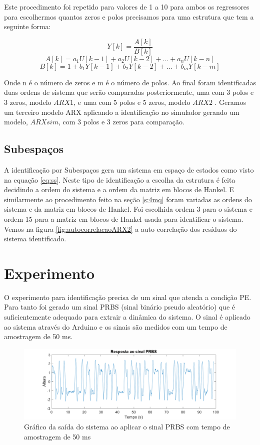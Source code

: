 Este procedimento foi repetido para valores de 1 a 10 para ambos os regressores para escolhermos quantos zeros e polos precisamos para uma estrutura que tem a seguinte forma:

\begin{equation}
Y[k]=\dfrac{A[k]}{B[k]}
\end{equation}
\begin{equation}
A[k]=a_1 U[k-1]+a_2 U[k-2]+ \dots + a_n U[k-n]
\end{equation}
\begin{equation}
B[k]=1+b_1 Y[k-1]+b_2 Y[k-2]+ \dots + b_m Y[k-m]
\end{equation}

Onde n é o número de zeros e m é o número de polos. Ao final foram identificadas duas ordens de sistema que serão comparadas posteriormente, uma com 3 polos e 3 zeros, modelo $ARX1$, e uma com 5 polos e 5 zeros, modelo $ARX2$  . Geramos um terceiro modelo ARX aplicando a identificação no simulador gerando um modelo, $ARXsim$, com 3 polos e 3 zeros para comparação.

\subsection{Subespaços}\label{s:4subespacos}
A identificação por Subespaços gera um sistema em espaço de estados como visto na equação \eqref{eq:ss}. Neste tipo de identificação a escolha da estrutura é feita decidindo a ordem do sistema e a ordem da matriz em blocos de Hankel. E similarmente ao procedimento feito na seção \ref{s:4mq} foram variadas as ordens do sistema e da matriz em blocos de Hankel.
Foi escolhida ordem 3 para o sistema e ordem 15 para a matriz em blocos de Hankel usada para identificar o sistema. Vemos na figura \ref{fig:autocorrelacaoARX2} a auto correlação dos resíduos do sistema identificado. 



\section{Experimento}\label{s:4experimento}
O experimento para identificação precisa de um sinal que atenda a condição PE. Para tanto foi gerado um sinal PRBS (sinal binário pseudo aleatório) que é suficientemente adequado para extrair a dinâmica do sistema. O sinal é aplicado ao sistema através do Arduino e os sinais são medidos com um tempo de amostragem de 50 ms.
\begin{figure}[H]
	\centering
	\includegraphics[width=1\linewidth]{sinalprbsid}
	\caption[Gráfico da saída PRBS do sistema]{Gráfico da saída do sistema ao aplicar o sinal PRBS com tempo de amostragem de 50 ms}
	\label{fig:sinalprbsid}
\end{figure}

